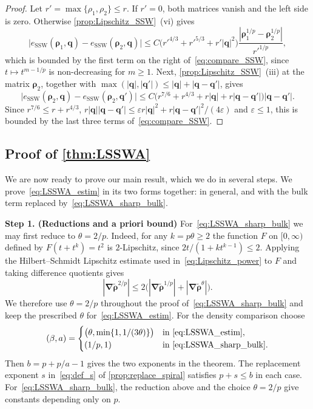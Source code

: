 \documentclass[final,reqno]{amsart}
\theoremstyle{remark}
\renewcommand{\le}{\leqslant}
\renewcommand{\ge}{\geqslant}
\renewcommand{\epsilon}{\varepsilon}
\newcommand{\wt}[1]{\widetilde{#1}}
\newcommand{\SSW}{\mathrm{SSW}}
\newcommand{\grad}{\bm{\nabla}}
\begin{document}
\begin{proof}
Let $r'=\max\{\rho_1,\rho_2\}\le r$. If $r'=0$, both matrices vanish and the left side is zero. Otherwise \cref{prop:Lipschitz_SSW}~(vi) gives
$$
\big|e_\SSW(\bm{\rho}_1,\mathbf{q})-e_\SSW(\bm{\rho}_2,\mathbf{q})\big|\le C\big(r'^{4/3}+r'^{5/3}+r'|\mathbf{q}|^2\big)\frac{|\bm{\rho}_1^{1/p}-\bm{\rho}_2^{1/p}|}{r'^{1/p}},
$$
which is bounded by the first term on the right of~\cref{eq:compare_SSW}, since $t\mapsto t^{m-1/p}$ is non-decreasing for $m\ge1$. Next, \cref{prop:Lipschitz_SSW}~(iii) at the matrix $\bm{\rho}_2$, together with $\max(|\mathbf{q}|,|\mathbf{q}'|)\le|\mathbf{q}|+|\mathbf{q}-\mathbf{q}'|$, gives
$$
\big|e_\SSW(\bm{\rho}_2,\mathbf{q})-e_\SSW(\bm{\rho}_2,\mathbf{q}')\big|\le C\big(r^{7/6}+r^{4/3}+r|\mathbf{q}|+r|\mathbf{q}-\mathbf{q}'|\big)|\mathbf{q}-\mathbf{q}'|.
$$
Since $r^{7/6}\le r+r^{4/3}$, $r|\mathbf{q}||\mathbf{q}-\mathbf{q}'|\le\epsilon r|\mathbf{q}|^2+r|\mathbf{q}-\mathbf{q}'|^2/(4\epsilon)$ and $\epsilon\le1$, this is bounded by the last three terms of~\cref{eq:compare_SSW}.
\end{proof}

\subsection{Proof of \texorpdfstring{\cref{thm:LSSWA}}{the fixed-axis TSGA estimate}}\label{sec:proof_LSSWA}

We are now ready to prove our main result, which we do in several steps. We prove~\cref{eq:LSSWA_estim} in its two forms together: in general, and with the bulk term replaced by~\cref{eq:LSSWA_sharp_bulk}.

\medskip

\noindent\textbf{Step 1. (Reductions and a priori bound)} For~\cref{eq:LSSWA_sharp_bulk} we may first reduce to $\theta=2/p$. Indeed, for any $k=p\theta\ge2$ the function $F$ on $[0,\infty)$ defined by $F(t+t^k)=t^2$ is $2$-Lipschitz, since $2t/(1+kt^{k-1})\le2$. Applying the Hilbert--Schmidt Lipschitz estimate used in~\cref{eq:Lipschitz_power} to $F$ and taking difference quotients gives
\[
|\grad\wt{\bm{\rho}}^{2/p}|\le2\big(|\grad\wt{\bm{\rho}}^{1/p}|+|\grad\wt{\bm{\rho}}^\theta|\big).
\]
We therefore use $\theta=2/p$ throughout the proof of~\cref{eq:LSSWA_sharp_bulk} and keep the prescribed $\theta$ for~\cref{eq:LSSWA_estim}. For the density comparison choose
\begin{equation}\label{eq:def_a_b}
(\beta,a)=
\begin{cases}
\big(\theta,\min\{1,1/(3\theta)\}\big) & \text{in~\cref{eq:LSSWA_estim}},\\
(1/p,1) & \text{in~\cref{eq:LSSWA_sharp_bulk}}.
\end{cases}
\end{equation}
Then $b=p+p/a-1$ gives the two exponents in the theorem. The replacement exponent $s$ in~\cref{eq:def_s} of \cref{prop:replace_spiral} satisfies $p+s\le b$ in each case. For~\cref{eq:LSSWA_sharp_bulk}, the reduction above and the choice $\theta=2/p$ give constants depending only on $p$.
\end{document}
